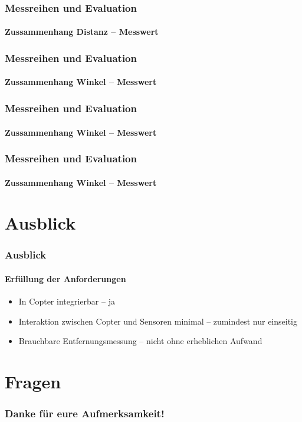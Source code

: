 \documentclass{beamer}
\begin{document}
\begin{frame}
	\frametitle{Messreihen und Evaluation}
	\framesubtitle{Zussammenhang Distanz – Messwert}
	


\end{frame}

\begin{frame}
	\frametitle{Messreihen und Evaluation}
	\framesubtitle{Zussammenhang Winkel – Messwert}
	

\end{frame}

\begin{frame}
	\frametitle{Messreihen und Evaluation}
	\framesubtitle{Zussammenhang Winkel – Messwert}
	

\end{frame}


\begin{frame}
	\frametitle{Messreihen und Evaluation}
	\framesubtitle{Zussammenhang Winkel – Messwert}
	

\end{frame}




\section{Ausblick}
\begin{frame}
	\frametitle{Ausblick}
	\framesubtitle{Erfüllung der Anforderungen}
	\begin{itemize}
		\item In Copter integrierbar – ja
		\item Interaktion zwischen Copter und Sensoren minimal – zumindest nur einseitig
		\item Brauchbare Entfernungsmessung – nicht ohne erheblichen Aufwand
	\end{itemize}
\end{frame}
\section*{Fragen}
\begin{frame}
 \frametitle{Danke für eure Aufmerksamkeit!}
\end{frame}
\end{document}
